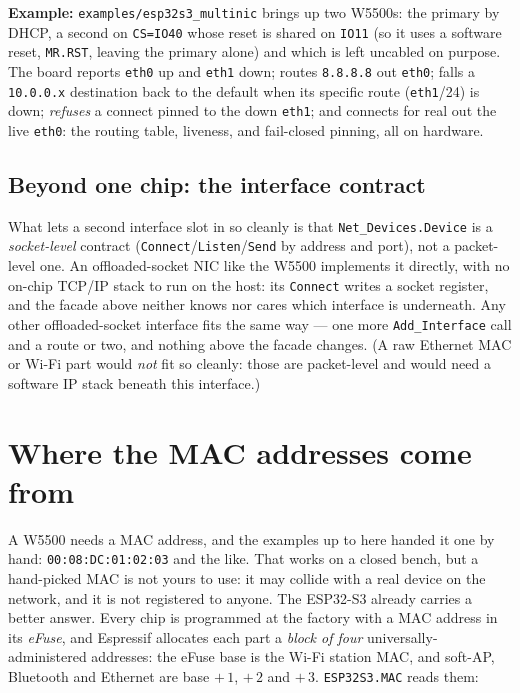 \noindent\textbf{Example:} \texttt{examples/esp32s3\_multinic} brings up two W5500s:
the primary by DHCP, a second on \texttt{CS=IO40} whose reset is shared on
\texttt{IO11} (so it uses a software reset, \texttt{MR.RST}, leaving the primary
alone) and which is left uncabled on purpose. The board reports \texttt{eth0} up and
\texttt{eth1} down; routes \texttt{8.8.8.8} out \texttt{eth0}; falls a \texttt{10.0.0.x}
destination back to the default when its specific route (\texttt{eth1}/24) is down;
\emph{refuses} a connect pinned to the down \texttt{eth1}; and connects for real out
the live \texttt{eth0}: the routing table, liveness, and fail-closed pinning, all
on hardware.

\subsection{Beyond one chip: the interface contract}

What lets a second interface slot in so cleanly is that \texttt{Net\_Devices.Device}
is a \emph{socket-level} contract (\texttt{Connect}/\texttt{Listen}/\texttt{Send} by
address and port), not a packet-level one. An offloaded-socket NIC like the W5500
implements it directly, with no on-chip TCP/IP stack to run on the host: its
\texttt{Connect} writes a socket register, and the facade above neither knows nor
cares which interface is underneath. Any other offloaded-socket interface fits the
same way --- one more \texttt{Add\_Interface} call and a route or two, and nothing
above the facade changes. (A raw Ethernet MAC or Wi-Fi part would \emph{not} fit so
cleanly: those are packet-level and would need a software IP stack beneath this
interface.)

\section{Where the MAC addresses come from}
\label{ch:net:mac}

A W5500 needs a MAC address, and the examples up to here handed it one by hand:
\texttt{00:08:DC:01:02:03} and the like. That works on a closed bench, but a
hand-picked MAC is not yours to use: it may collide with a real device on the network,
and it is not registered to anyone. The ESP32-S3 already carries a better answer. Every
chip is programmed at the factory with a MAC address in its \emph{eFuse}, and Espressif
allocates each part a \emph{block of four} universally-administered addresses: the eFuse
base is the Wi-Fi station MAC, and soft-AP, Bluetooth and Ethernet are base $+\,1$,
$+\,2$ and $+\,3$. \texttt{ESP32S3.MAC} reads them:

